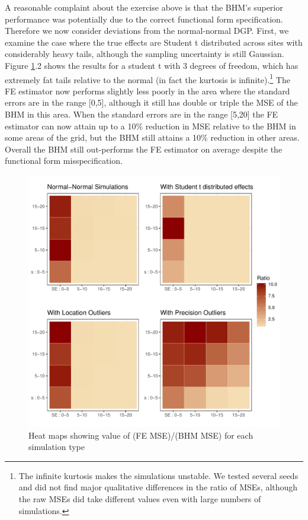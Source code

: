 \documentclass[12pt]{article}
\begin{document}
A reasonable complaint about the exercise above is that the BHM's superior performance was potentially due to the correct functional form specification. Therefore we now consider deviations from the normal-normal DGP. First, we examine the case where the true effects are Student t distributed across sites with considerably heavy tails, although the sampling uncertainty is still Gaussian. Figure \ref{heatmaps}.2 shows the results for a student t with 3 degrees of freedom, which has extremely fat tails relative to the normal (in fact the kurtosis is infinite).\footnote{The infinite kurtosis makes the simulations unstable. We tested several seeds and did not find major qualitative differences in the ratio of MSEs, although the raw MSEs did take different values even with large numbers of simulations.} The FE estimator now performs slightly less poorly in the area where the standard errors are in the range [0,5], although it still has double or triple the MSE of the BHM in this area. When the standard errors are in the range [5,20] the FE estimator can now attain up to a 10\% reduction in MSE relative to the BHM in some areas of the grid, but the BHM still attains a 10\% reduction in other areas. Overall the BHM still out-performs the FE estimator on average despite the functional form misspecification.

\begin{figure}
\centering
\includegraphics[scale=0.8]{heatmap_plots.pdf}
\caption{Heat maps showing value of (FE MSE)/(BHM MSE) for each simulation type}
\label{heatmaps}
\end{figure}
\end{document}
